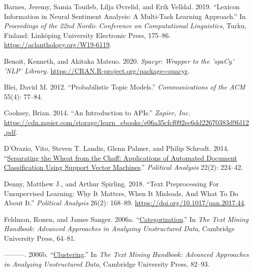 \documentclass[
]{article}
\newlength{\cslhangindent}
\newlength{\cslentryspacingunit} %
\newenvironment{CSLReferences}[2] %
 {%
  \setlength{\parindent}{0pt}
  \ifodd #1
  \let\oldpar\par
  \def\par{\hangindent=\cslhangindent\oldpar}
  \fi
  \setlength{\parskip}{#2\cslentryspacingunit}
 }%
 {}
\begin{document}
\hypertarget{refs}{}
\begin{CSLReferences}{1}{0}
\leavevmode{}%
Barnes, Jeremy, Samia Touileb, Lilja Øvrelid, and Erik Velldal. 2019.
{``Lexicon Information in Neural Sentiment Analysis: A Multi-Task
Learning Approach.''} In \emph{Proceedings of the 22nd Nordic Conference
on Computational Linguistics}, Turku, Finland: Link{ö}ping University
Electronic Press, 175--86. \url{https://aclanthology.org/W19-6119}.

\leavevmode{}%
Benoit, Kenneth, and Akitaka Matsuo. 2020. \emph{Spacyr: Wrapper to the
'spaCy' 'NLP' Library}. \url{https://CRAN.R-project.org/package=spacyr}.

\leavevmode{}%
Blei, David M. 2012. {``{P}robabilistic {T}opic {M}odels.''}
\emph{Communications of the ACM} 55(4): 77--84.

\leavevmode{}%
Cooksey, Brian. 2014. {``An Introduction to {API}s.''} \emph{Zapier,
Inc.}
\url{https://cdn.zapier.com/storage/learn_ebooks/e06a35cfcf092ec6dd22670383d9fd12.pdf}.

\leavevmode{}%
D'Orazio, Vito, Steven T. Landis, Glenn Palmer, and Philip Schrodt.
2014. {``\href{https://doi.org/10.1093/pan/mpt030}{Separating the Wheat
from the Chaff: Applications of Automated Document Classification Using
Support Vector Machines}.''} \emph{Political Analysis} 22(2): 224--42.

\leavevmode{}%
Denny, Matthew J., and Arthur Spirling. 2018. {``{T}ext {P}reprocessing
{F}or {U}nsupervised {L}earning: {W}hy {I}t {M}atters, {W}hen {I}t
{M}isleads, {A}nd {W}hat {T}o {D}o {A}bout {I}t.''} \emph{Political
Analysis} 26(2): 168--89. \url{https://doi.org/10.1017/pan.2017.44}.

\leavevmode{}%
Feldman, Ronen, and James Sanger. 2006a.
{``\href{https://doi.org/10.1017/CBO9780511546914.005}{Categorization}.''}
In \emph{The Text Mining Handbook: Advanced Approaches in Analyzing
Unstructured Data}, Cambridge University Press, 64--81.

\leavevmode{}%
---------. 2006b.
{``\href{https://doi.org/10.1017/CBO9780511546914.006}{Clustering}.''}
In \emph{The Text Mining Handbook: Advanced Approaches in Analyzing
Unstructured Data}, Cambridge University Press, 82--93.


\end{CSLReferences}
\end{document}
